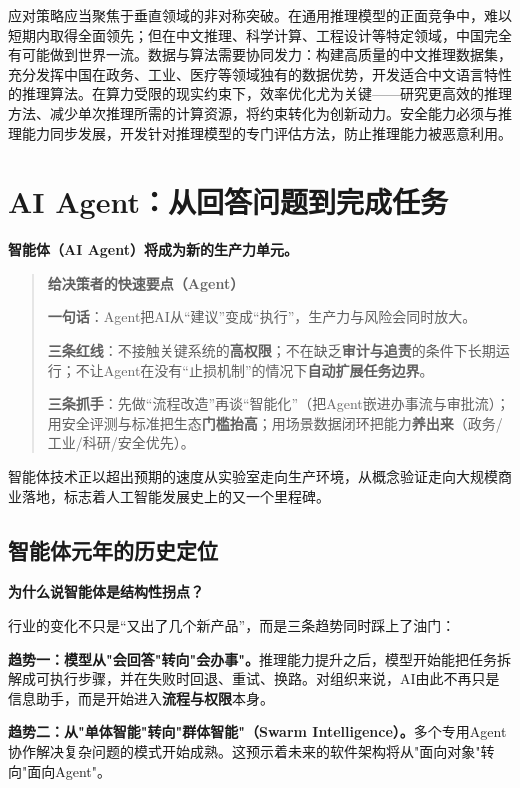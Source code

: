 应对策略应当聚焦于垂直领域的非对称突破。在通用推理模型的正面竞争中，难以短期内取得全面领先；但在中文推理、科学计算、工程设计等特定领域，中国完全有可能做到世界一流。数据与算法需要协同发力：构建高质量的中文推理数据集，充分发挥中国在政务、工业、医疗等领域独有的数据优势，开发适合中文语言特性的推理算法。在算力受限的现实约束下，效率优化尤为关键——研究更高效的推理方法、减少单次推理所需的计算资源，将约束转化为创新动力。安全能力必须与推理能力同步发展，开发针对推理模型的专门评估方法，防止推理能力被恶意利用。

\section{AI Agent：从回答问题到完成任务}

\textbf{智能体（AI Agent）将成为新的生产力单元。}

\begin{quote}
	\textbf{给决策者的快速要点（Agent）}

	\textbf{一句话}：Agent把AI从“建议”变成“执行”，生产力与风险会同时放大。

		\textbf{三条红线}：不接触关键系统的\textbf{高权限}；不在缺乏\textbf{审计与追责}的条件下长期运行；不让Agent在没有“止损机制”的情况下\textbf{自动扩展任务边界}。

		\textbf{三条抓手}：先做“流程改造”再谈“智能化”（把Agent嵌进办事流与审批流）；用安全评测与标准把生态\textbf{门槛抬高}；用场景数据闭环把能力\textbf{养出来}（政务/工业/科研/安全优先）。
\end{quote}

智能体技术正以超出预期的速度从实验室走向生产环境，从概念验证走向大规模商业落地，标志着人工智能发展史上的又一个里程碑。

\subsection{智能体元年的历史定位}

	\textbf{为什么说智能体是结构性拐点？}

行业的变化不只是“又出了几个新产品”，而是三条趋势同时踩上了油门：

		\textbf{趋势一：模型从"会回答"转向"会办事"。}推理能力提升之后，模型开始能把任务拆解成可执行步骤，并在失败时回退、重试、换路。对组织来说，AI由此不再只是信息助手，而是开始进入\textbf{流程与权限}本身。

		\textbf{趋势二：从"单体智能"转向"群体智能"（Swarm Intelligence）。}多个专用Agent协作解决复杂问题的模式开始成熟。这预示着未来的软件架构将从"面向对象"转向"面向Agent"。

